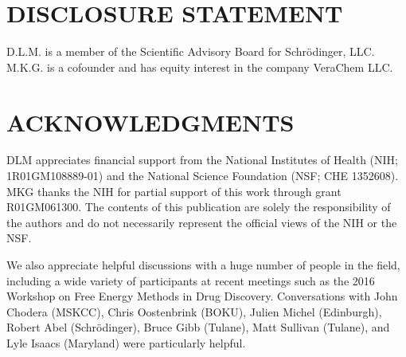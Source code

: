\documentclass[aps,pre,twocolumn,nofootinbib,superscriptaddress,10pt, final,tightenlines]{revtex4-1}
\begin{document}
\section*{DISCLOSURE STATEMENT}
D.L.M. is a member of the Scientific Advisory Board for Schr\"{o}dinger, LLC. M.K.G. is a cofounder and has equity interest in the company VeraChem LLC.

\section*{ACKNOWLEDGMENTS}
DLM appreciates financial support from the National Institutes of Health (NIH; 1R01GM108889-01) and the National Science Foundation  (NSF; CHE 1352608). MKG thanks the NIH for partial support of this work through grant R01GM061300. The contents of this publication are solely the responsibility of the authors and do not necessarily represent the official views of the NIH or the NSF. 

We also appreciate helpful discussions with a huge number of people in the field, including a wide variety of participants at recent meetings such as the 2016 Workshop on Free Energy Methods in Drug Discovery.
Conversations with John Chodera (MSKCC), Chris Oostenbrink (BOKU), Julien Michel (Edinburgh), Robert Abel (Schr\"{o}dinger), Bruce Gibb (Tulane), Matt Sullivan (Tulane), and Lyle Isaacs (Maryland) were particularly helpful.





\end{document}
